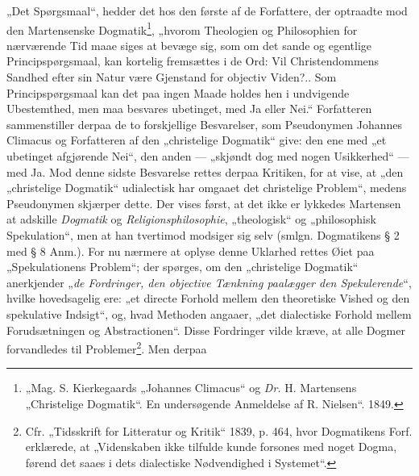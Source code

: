 \documentclass[12pt,a4paper]{book}
\newcommand{\opage}[1]{\marginnote{\footnotesize\textit{[#1]}}}
\begin{document}
„Det Spørgsmaal“, hedder det hos den første af de Forfattere, der optraadte mod den Martensenske Dogmatik\footnote{„Mag. S. Kierkegaards „Johannes Climacus“ og \textit{Dr.} H. Martensens „Christelige Dogmatik“. En undersøgende Anmeldelse af R. Nielsen“. 1849.}, „hvorom Theologien og Philosophien for nærværende Tid maae siges at bevæge sig, som om det sande og egentlige Principspørgsmaal, kan kortelig fremsættes i de Ord: Vil Christendommens Sandhed efter sin Natur være Gjenstand for objectiv Viden?.. Som Principspørgsmaal kan det paa ingen Maade holdes hen i undvigende Ubestemthed, men maa besvares ubetinget, med Ja eller Nei.“ Forfatteren sammenstiller derpaa de to forskjellige Besvarelser, som Pseudonymen Johannes Climacus og Forfatteren af den „christelige Dogmatik“ give: den ene med „et ubetinget afgjørende Nei“, den anden --- „skjøndt dog med nogen Usikkerhed“ --- med Ja. Mod denne sidste Besvarelse rettes derpaa Kritiken, for at vise, at „den „christelige Dogmatik“ udialectisk har omgaaet det christelige Problem“, medens Pseudonymen skjærper dette. Der vises først, at det ikke er lykkedes Martensen at adskille \emph{Dogmatik} og \emph{Religionsphilosophie}, „theologisk“ og „philosophisk Spekulation“, men at han tvertimod modsiger sig selv (smlgn. Dogmatikens § 2 med § 8 Anm.). For nu nærmere at oplyse denne Uklarhed rettes Øiet paa „Spekulationens Problem“; der spørges, om den „christelige Dogmatik“ anerkjender „\emph{de Fordringer, den objective Tænkning paalægger den Spekulerende}“, hvilke hovedsagelig ere: „et directe Forhold mellem den theoretiske Vished og den spekulative Indsigt“, og, hvad Methoden angaaer, „det dialectiske Forhold mellem Forudsætningen og Abstractionen“. Disse Fordringer vilde kræve, at alle Dogmer forvandledes til Problemer\footnote{%
Cfr. „Tidsskrift for Litteratur og Kritik“ 1839, p. 464, hvor Dogmatikens Forf. erklærede, at „Videnskaben ikke tilfulde kunde
forsones med noget Dogma, førend det saaes i dets dialectiske Nødvendighed i Systemet“.}. Men derpaa
\opage{27}\setcounter{footnote}{0}%
\end{document}
